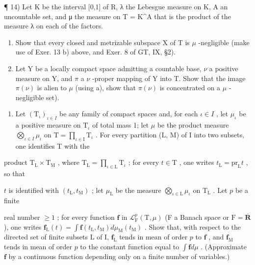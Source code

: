 ¶ 14) Let K be the interval {[}0,1{]} of R, λ the Lebesgue measure on K, A an uncountable set, and μ the measure on T = K\^{}A that is the product of the measure λ on each of the factors.

\begin{enumerate}
\def\labelenumi{\alph{enumi})}
\item
  Show that every closed and metrizable subspace X of T is \(\mu\) -negligible (make use of Exer. 13 b) above, and Exer. 8 of GT, IX, §2).
\item
  Let Y be a locally compact space admitting a countable base, \(\nu\) a positive measure on Y, and \(\pi\) a \(\nu\) -proper mapping of Y into T. Show that the image \(\pi(\nu)\) is alien to \(\mu\) (using a), show that \(\pi(\nu)\) is concentrated on a \(\mu\) -negligible set).
\end{enumerate}

\begin{enumerate}
\def\labelenumi{\arabic{enumi})}
\setcounter{enumi}{14}
\tightlist
\item
  Let \((\mathrm{T}_{\iota})_{\iota \in I}\) be any family of compact spaces and, for each \(\iota \in I\) , let \(\mu_{\iota}\) be a positive measure on \(\mathrm{T}_{\iota}\) of total mass 1; let \(\mu\) be the product measure \(\bigotimes_{\iota \in I} \mu_{\iota}\) on \(\mathrm{T} = \prod_{\iota \in \mathrm{I}}\mathrm{T}_{\iota}\) . For every partition (L, M) of I into two subsets, one identifies T with the
\end{enumerate}

product \(\mathrm{T_L} \times \mathrm{T_M}\) , where \(\mathrm{T_L} = \prod_{\iota \in \mathrm{L}} \mathrm{T}_{\iota}\) ; for every \(t \in \mathrm{T}\) , one writes \(t_{\mathrm{L}} = \mathrm{pr}_{\mathrm{L}} t\) , so that

\(t\) is identified with \((t_{\mathrm{L}}, t_{\mathrm{M}})\) ; let \(\mu_{\mathrm{L}}\) be the measure \(\bigotimes_{\iota \in \mathrm{L}} \mu_{\iota}\) on \(\mathrm{T}_{\mathrm{L}}\) . Let \(p\) be a finite

real number \(\geqslant 1\) ; for every function \(\mathbf{f}\) in \(\mathcal{L}_{\mathrm{F}}^{p}(\mathrm{T},\mu)\) (F a Banach space or \(\mathrm{F} = \overline{\mathbf{R}}\) ), one writes \(\mathbf{f}_{\mathrm{L}}(t) = \int \mathbf{f}(t_{\mathrm{L}},t_{\mathrm{M}}) d\mu_{\mathrm{M}}(t_{\mathrm{M}})\) . Show that, with respect to the directed set of finite subsets L of I, \(\mathbf{f}_{\mathrm{L}}\) tends in mean of order \(p\) to \(\mathbf{f}\) , and \(\mathbf{f}_{\mathrm{M}}\) tends in mean of order \(p\) to the constant function equal to \(\int \mathbf{f} d\mu\) . (Approximate \(\mathbf{f}\) by a continuous function depending only on a finite number of variables.)

